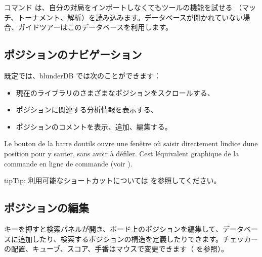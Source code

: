 \documentclass[letterpaper,10pt,dvipdfmx]{sphinxmanual}
\begin{document}
\sphinxAtStartPar
コマンド  は、自分の対局をインポートしなくてもツールの機能を試せる  （マッチ、トーナメント、解析）を読み込みます。データベースが開かれていない場合、ガイドツアーはこのデータベースを利用します。


\subsection{ポジションのナビゲーション}
\label{\detokenize{manuel:navigation-dans-les-positions}}\label{\detokenize{manuel:navigation-positions}}
\sphinxAtStartPar
既定では、blunderDB では次のことができます：
\begin{itemize}
\item {} 
\sphinxAtStartPar
現在のライブラリのさまざまなポジションをスクロールする、

\item {} 
\sphinxAtStartPar
ポジションに関連する分析情報を表示する、

\item {} 
\sphinxAtStartPar
ポジションのコメントを表示、追加、編集する。

\end{itemize}

\sphinxAtStartPar
Le bouton  de la barre d\textquotesingle{}outils ouvre une fenêtre où
saisir directement l\textquotesingle{}indice d\textquotesingle{}une position pour y sauter, sans avoir à
défiler. C\textquotesingle{}est l\textquotesingle{}équivalent graphique de la commande \sphinxcode{\sphinxupquote{{[}number{]}}} en ligne de
commande (voir {\hyperref[\detokenize{cmd_mode:cmd-positions}]{}}).

\begin{sphinxadmonition}{tip}{Tip:}
\sphinxAtStartPar
利用可能なショートカットについては {\hyperref[\detokenize{raccourcis:raccourcis}]{}} を参照してください。
\end{sphinxadmonition}


\subsection{ポジションの編集}
\label{\detokenize{manuel:edition-de-positions}}\label{\detokenize{manuel:edition-positions}}
\sphinxAtStartPar
{} キーを押すと検索パネルが開き、ボード上のポジションを編集して、データベースに追加したり、検索するポジションの構造を定義したりできます。チェッカーの配置、キューブ、スコア、手番はマウスで変更できます（{\hyperref[\detokenize{guide_utilisateur:guide-edit-position}]{}} を参照）。
\end{document}
